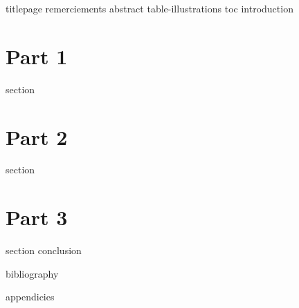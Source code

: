\documentclass[12pt]{article}
\begin{document}
    {titlepage}
    {remerciements}
    {abstract}
    {table-illustrations}
    {toc}
    {introduction}


    \clearpage{}
    \part{Part 1}

    {section}

    \clearpage{}
    \part{Part 2}

    {section}

    \clearpage{}
    \part{Part 3}

    {section}
    {conclusion}


    {bibliography}

    \clearpage{}
    \printglossaries

    {appendicies}
\end{document}
